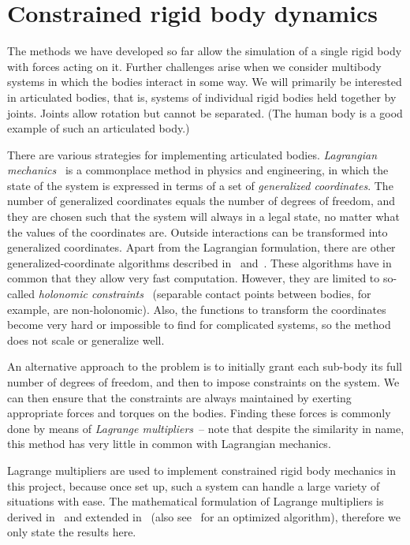 \section{Constrained rigid body dynamics\label{constraints}}
The methods we have developed so far allow the simulation of a single rigid body with forces
acting on it. Further challenges arise when we consider multibody systems in which the bodies
interact in some way. We will primarily be interested in articulated bodies, that is, systems
of individual rigid bodies held together by joints. Joints allow rotation but cannot be
separated. (The human body is a good example of such an articulated body.)

There are various strategies for implementing articulated bodies. \emph{Lagrangian
mechanics}~\cite{Hand:98,Goldstein:80} is a commonplace method in physics and engineering, in
which the state of the system is expressed in terms of a set of \emph{generalized coordinates}.
The number of generalized coordinates equals the number of degrees of freedom, and they are
chosen such that the system will always in a legal state, no matter what the values of the
coordinates are. Outside interactions can be transformed into generalized coordinates. Apart
from the Lagrangian formulation, there are other generalized-coordinate algorithms described
in~\cite{Wilhelms:91} and~\cite{Featherstone:87}. These algorithms have in common that they
allow very fast computation. However, they are limited to so-called \emph{holonomic
constraints}~\cite{Hand:98} (separable contact points between bodies, for example, are
non-holonomic). Also, the functions to transform the coordinates become very hard or
impossible to find for complicated systems, so the method does not scale or generalize well.

An alternative approach to the problem is to initially grant each sub-body its full number of
degrees of freedom, and then to impose constraints on the system. We can then ensure that the
constraints are always maintained by exerting appropriate forces and torques on the bodies.
Finding these forces is commonly done by means of \emph{Lagrange multipliers}~-- note that
despite the similarity in name, this method has very little in common with Lagrangian mechanics.

Lagrange multipliers are used to implement constrained rigid body mechanics in this project,
because once set up, such a system can handle a large variety of situations with ease.
The mathematical formulation of Lagrange multipliers is derived in~\cite{BaraffWitkin:97} and
extended in~\cite{Saunders:PhD} (also see~\cite{Baraff:96} for an optimized algorithm),
therefore we only state the results here.

